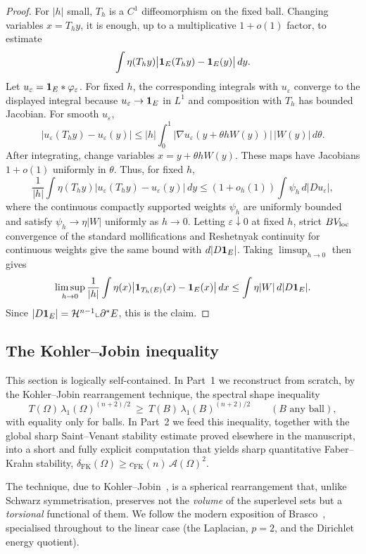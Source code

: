 \documentclass[11pt]{amsart}
\theoremstyle{definition}
\newcommand{\Om}{\Omega}
\newcommand{\Fr}{\mathcal A}
\newcommand{\eps}{\varepsilon}
\newcommand{\Hn}{\mathcal H^{n-1}}
\begin{document}
\begin{proof}
For \(|h|\) small, \(T_h\) is a \(C^1\) diffeomorphism on the fixed ball.
Changing variables \(x=T_hy\), it is enough, up to a multiplicative
\(1+o(1)\) factor, to estimate
\[
   \int \eta(T_hy)\bigl|{\bf1}_E(T_hy)-{\bf1}_E(y)\bigr|\,dy .
\]
Let \(u_\eps={\bf1}_E*\varphi_\eps\).  For fixed \(h\), the corresponding
integrals with \(u_\eps\) converge to the displayed integral because
\(u_\eps\to{\bf1}_E\) in \(L^1\) and composition with \(T_h\) has bounded
Jacobian.  For smooth \(u_\eps\),
\[
   |u_\eps(T_hy)-u_\eps(y)|
   \le |h|\int_0^1
      |\nabla u_\eps(y+\theta hW(y))|\,|W(y)|\,d\theta .
\]
After integrating, change variables \(x=y+\theta hW(y)\).  These maps have
Jacobians \(1+o(1)\) uniformly in \(\theta\).  Thus, for fixed \(h\),
\[
   \frac1{|h|}\int \eta(T_hy)|u_\eps(T_hy)-u_\eps(y)|\,dy
   \le
   (1+o_h(1))\int \psi_h\,d|Du_\eps|,
\]
where the continuous compactly supported weights \(\psi_h\) are uniformly
bounded and satisfy \(\psi_h\to\eta|W|\) uniformly as \(h\to0\).  Letting
\(\eps\downarrow0\) at fixed \(h\), strict \(BV_{\rm loc}\) convergence of
the standard mollifications and Reshetnyak continuity for continuous weights
\cite{AFP2000,Maggi2012} give the same bound with \(d|D{\bf1}_E|\).  Taking
\(\limsup_{h\to0}\) then gives
\[
   \limsup_{h\to0}\frac1{|h|}
   \int \eta(x)\bigl|{\bf1}_{T_h(E)}(x)-{\bf1}_E(x)\bigr|\,dx
   \le
   \int \eta|W|\,d|D{\bf1}_E|.
\]
Since \(|D{\bf1}_E|=\Hn\llcorner\partial^*E\), this is the claim.
\end{proof}

\subsection{The Kohler--Jobin inequality}\label{sec:kj}

This section is logically self-contained. In Part~1 we reconstruct from
scratch, by the Kohler--Jobin rearrangement technique, the spectral shape
inequality
\[
  T(\Om)\,\lambda_1(\Om)^{(n+2)/2}\ \ge\ T(B)\,\lambda_1(B)^{(n+2)/2}
  \qquad(B\text{ any ball}),
\]
with equality only for balls. In Part~2 we feed this inequality, together
with the global sharp Saint--Venant stability estimate proved elsewhere in
the manuscript, into a short and fully explicit computation that yields
sharp quantitative Faber--Krahn stability,
$\delta_{\mathrm{FK}}(\Om)\ge c_{\mathrm{FK}}(n)\,\Fr(\Om)^2$.

The technique, due to Kohler--Jobin~\cite{KJ1,KJ2,KJ3}, is a spherical
rearrangement that, unlike Schwarz symmetrisation, preserves not the
\emph{volume} of the superlevel sets but a \emph{torsional} functional of
them. We follow the modern exposition of Brasco~\cite[\S\S3--5,
Thm.~1.1]{Brasco2014}, specialised throughout to the linear case (the
Laplacian, $p=2$, and the Dirichlet energy quotient).
\end{document}
